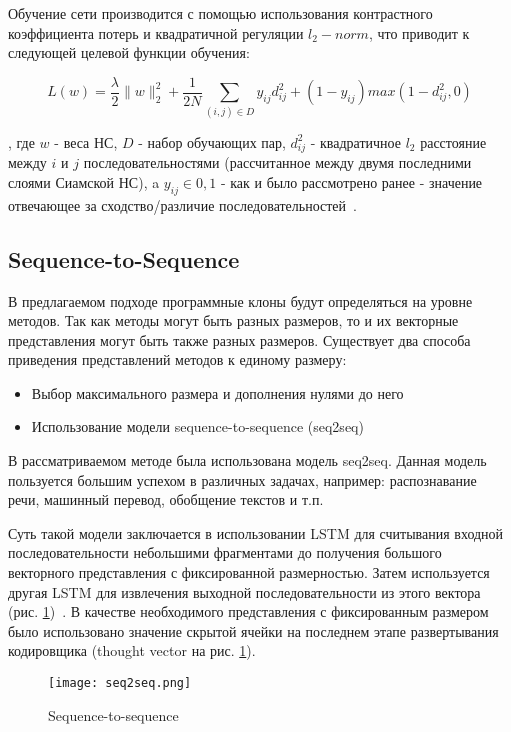 Обучение сети производится с помощью использования контрастного коэффициента потерь и квадратичной регуляции \(l_2-norm\), что приводит к следующей целевой функции обучения:

\begin{equation}
\label{eq:contrastive}
L(w)=\frac{\lambda}{2}\|w\|_2^2+\frac{1}{2N}\sum_{(i,j) \in D}y_{ij}d_{ij}^2+(1-y_{ij}) max(1-d_{ij}^2,0)
\end{equation}

, где \(w\) - веса НС, \(D\) - набор обучающих пар, \(d_{ij}^2\) - квадратичное \(l_2\) расстояние между \(i\) и \(j\) последовательностями (рассчитанное между двумя последними слоями Сиамской НС), a \(y_{ij} \in {0,1}\) - как и было рассмотрено ранее - значение отвечающее за сходство/различие последовательностей~\cite{siam}.

\subsection{Sequence-to-Sequence}

В предлагаемом подходе программные клоны будут определяться на уровне методов. Так как методы могут быть разных размеров, то и их векторные представления могут быть также разных размеров. Существует два способа приведения представлений методов к единому размеру:

\begin{itemize}
\setlength\itemsep{0mm}
\item Выбор максимального размера и дополнения нулями до него
\item Использование модели sequence-to-sequence	(seq2seq)
\end{itemize}

В рассматриваемом методе была использована модель seq2seq. Данная модель пользуется большим успехом в различных задачах, например: распознавание речи, машинный перевод, обобщение текстов и т.п.

Суть такой модели заключается в использовании LSTM для считывания входной последовательности небольшими фрагментами до получения большого векторного представления с фиксированной размерностью. Затем используется другая LSTM для извлечения выходной последовательности из этого вектора (рис. \ref{fig:seq2seq})~\cite{seq2seq}. В качестве необходимого представления с фиксированным размером было использовано значение скрытой ячейки на последнем этапе развертывания кодировщика (thought vector на рис. \ref{fig:seq2seq}).

\begin{figure}[htbp]
\centering
\texttt{[image: seq2seq.png]}
\caption{Sequence-to-sequence}
\label{fig:seq2seq}
\end{figure}

